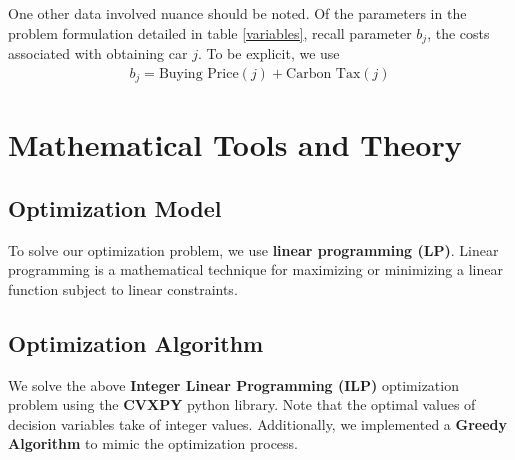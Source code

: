 \documentclass{article}
\begin{document}
\begin{table}[h]
    \centering
    \caption{Same sample rows now including additional generated data.}
    \label{tab:vehicle_data_updated}
\end{table}

One other data involved nuance should be noted. Of the parameters in the problem formulation detailed in table \ref{variables}, recall parameter $b_j$, the costs associated with obtaining car $j$. To be explicit, we use
\begin{align*}
    b_j=\text{Buying Price}(j)+\text{Carbon Tax}(j)
\end{align*}

\section{Mathematical Tools and Theory}

\subsection{Optimization Model}
To solve our optimization problem, we use \textbf{linear programming (LP)}. 
Linear programming is a mathematical technique for maximizing or minimizing a linear function subject to linear constraints.


\subsection{Optimization Algorithm}
We solve the above \textbf{Integer Linear Programming (ILP)} optimization problem using the \textbf{CVXPY} python library. Note that the optimal values of decision variables take of integer values. Additionally, we implemented a \textbf{Greedy Algorithm} to mimic the optimization process.
\end{document}
